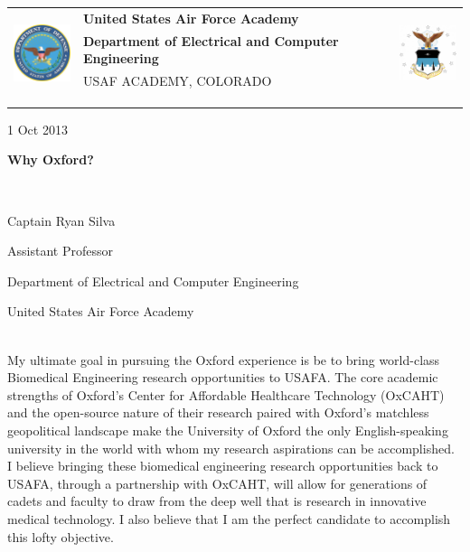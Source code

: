 \documentclass{article}
\begin{document}
	\noindent \begin{tabu} to \textwidth{l X[c] r}
	 & 
	\textbf{United States Air Force Academy} &  
	\\
	& \textbf{Department of Electrical and Computer Engineering} & \\
	& \tiny{USAF ACADEMY, COLORADO}\\
	\\ \\ \\
	\end{tabu}

	\hfill 1 Oct 2013
	\centerline{\LARGE{\textbf{Why Oxford?}}} \hspace{0pt} \\
	\centerline{\Large{Captain Ryan Silva}}
	\centerline{\large{Assistant Professor}}
	\centerline{\large{Department of Electrical and Computer Engineering}}
	\centerline{\large{United States Air Force Academy}} \hspace{0pt} \\
\indent My ultimate goal in pursuing the Oxford experience is be to bring world-class
Biomedical Engineering research opportunities to USAFA. The core academic
strengths of Oxford's Center for Affordable Healthcare Technology (OxCAHT) and
the open-source nature of their research paired with Oxford's matchless
geopolitical landscape make the University of Oxford the only English-speaking
university in the world with whom my research aspirations can be accomplished.
I believe bringing these biomedical engineering research opportunities back
to USAFA, through a partnership with OxCAHT, will allow for generations of cadets
and faculty to draw from the deep well that is research in innovative medical technology.
I also believe that I am the perfect candidate to accomplish
this lofty objective.
\end{document}
